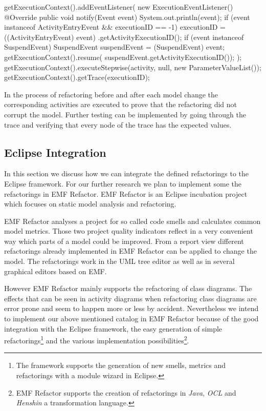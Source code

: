\documentclass{llncs}
\begin{document}
\begin{lstsingle}[language=Java,caption=Executing the activity stepwise and getting the execution trace,label=lst:execution]
getExecutionContext().addEventListener(
  new ExecutionEventListener() {
  @Override
  public void notify(Event event) {
    System.out.println(event);
    if (event instanceof ActivityEntryEvent 
      && executionID == -1) {
      executionID = ((ActivityEntryEvent) event)
          .getActivityExecutionID();
    }
    if (event instanceof SuspendEvent) {
      SuspendEvent suspendEvent = (SuspendEvent) event;
      getExecutionContext().resume(
          suspendEvent.getActivityExecutionID());
    }
  }
});
getExecutionContext().executeStepwise(activity, null, 
  new ParameterValueList());
getExecutionContext().getTrace(executionID);
\end{lstsingle}

In the process of refactoring before and after each model change the corresponding activities are executed to prove that 
the refactoring did not corrupt the model. 
Further testing can be implemented by going through the trace and verifying 
that every node of the trace has the expected values.

\subsection{Eclipse Integration}
\label{sec:guiintegration}
In this section we discuss how we can integrate the defined refactorings to the Eclipse framework. For our further 
research we plan to implement some the refactorings in EMF Refactor. EMF Refactor is an Eclipse incubation project 
which focuses on static model analysis and refactoring.

EMF Refactor analyses a project for so called code smells and calculates common model metrics. Those two project quality 
indicators reflect in a very convenient way which parts of a model could be improved. From a report view different 
refactorings already implemented in EMF Refactor can be applied to change the model. The refactorings work in the UML tree 
editor as well as in several graphical editors based on EMF.

However EMF Refactor mainly supports the refactoring of class diagrams. The effects that can be seen in activity diagrams 
when refactoring class diagrams are error prone and seem to happen more or less by accident. Nevertheless we intend to 
implement our above mentioned catalog in EMF Refactor because of the good integration with the Eclipse framework, the 
easy generation of simple refactorings\footnote{The framework supports the generation of new smells, metrics and 
refactorings with a module wizard in Eclipse.} and the various implementation possibilities\footnote{EMF Refactor 
supports the creation of refactorings in \textit{Java}, \textit{OCL} and \textit{Henshin} a transformation language.}.
\end{document}
